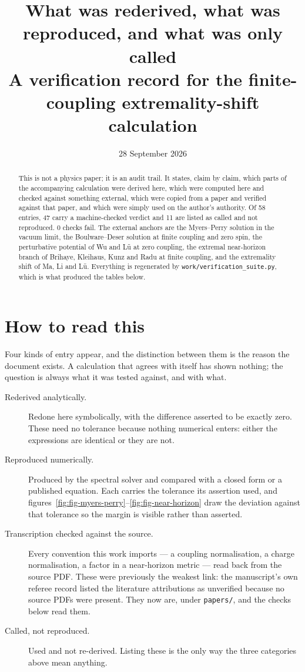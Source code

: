 \documentclass[11pt,a4paper]{article}
\title{What was rederived, what was reproduced, and what was only called\\[.35em]
\large A verification record for the finite-coupling extremality-shift calculation}
\author{}
\date{28 September 2026}
\begin{document}
\maketitle
\thispagestyle{empty}

\begin{abstract}
\noindent
This is not a physics paper; it is an audit trail. It states, claim by claim,
which parts of the accompanying calculation were derived here, which were
computed here and checked against something external, which were copied from a
paper and verified against that paper, and which were simply used on the
author's authority. Of 58 entries,
47 carry a machine-checked verdict and
11 are listed as called and not reproduced.
0 checks fail.
The external anchors are the Myers--Perry solution in the vacuum limit, the
Boulware--Deser solution at finite coupling and zero spin, the perturbative
potential of Wu and L\"u at zero coupling, the extremal near-horizon branch of
Brihaye, Kleihaus, Kunz and Radu at finite coupling, and the extremality shift
of Ma, Li and L\"u. Everything is regenerated by
\texttt{work/verification\_suite.py}, which is what produced the tables below.
\end{abstract}

\section*{How to read this}

Four kinds of entry appear, and the distinction between them is the reason the
document exists. A calculation that agrees with itself has shown nothing; the
question is always what it was tested against, and with what.

\begin{description}
\item[Rederived analytically.] Redone here symbolically, with the difference
asserted to be exactly zero. These need no tolerance because nothing numerical
enters: either the expressions are identical or they are not.
\item[Reproduced numerically.] Produced by the spectral solver and compared with
a closed form or a published equation. Each carries the tolerance its assertion
used, and figures~\ref{fig:fig-myers-perry}--\ref{fig:fig-near-horizon} draw
the deviation against that tolerance so the margin is visible rather than
asserted.
\item[Transcription checked against the source.] Every convention this work
imports --- a coupling normalisation, a charge normalisation, a factor in a
near-horizon metric --- read back from the source PDF. These were previously the
weakest link: the manuscript's own referee record listed the literature
attributions as unverified because no source PDFs were present. They now are,
under \texttt{papers/}, and the checks below read them.
\item[Called, not reproduced.] Used and not re-derived. Listing these is the
only way the three categories above mean anything.
\end{description}
\end{document}
